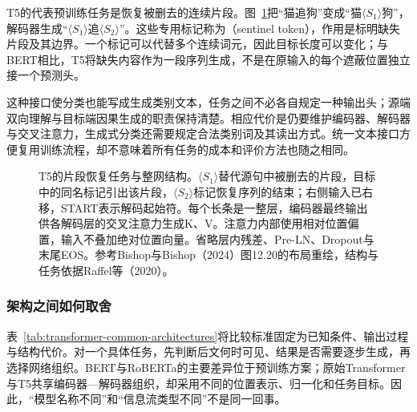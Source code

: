 T5的代表预训练任务是恢复被删去的连续片段。图~\ref{fig:transformer-architecture-t5}把“猫追狗”变成“猫$\langle S_1\rangle$狗”，解码器生成“$\langle S_1\rangle$追$\langle S_2\rangle$”。这些专用标记称为（sentinel token），作用是标明缺失片段及其边界。一个标记可以代替多个连续词元，因此目标长度可以变化；与BERT相比，T5将缺失内容作为一段序列生成，不是在原输入的每个遮蔽位置独立接一个预测头。

这种接口使分类也能写成生成类别文本，任务之间不必各自规定一种输出头；源端双向理解与目标端因果生成的职责保持清楚。相应代价是仍要维护编码器、解码器与交叉注意力，生成式分类还需要规定合法类别词及其读出方式。统一文本接口方便复用训练流程，却不意味着所有任务的成本和评价方法也随之相同。

\begin{figure}[p]
  \centering
  
  \caption{T5的片段恢复任务与整网结构。$\langle S_1\rangle$替代源句中被删去的片段，目标中的同名标记引出该片段，$\langle S_2\rangle$标记恢复序列的结束；右侧输入已右移，START表示解码起始符。每个长条是一整层，编码器最终输出供各解码层的交叉注意力生成K、V。注意力内部使用相对位置偏置，输入不叠加绝对位置向量。省略层内残差、Pre-LN、Dropout与末尾EOS。参考Bishop与Bishop（2024）图12.20的布局重绘，结构与任务依据Raffel等（2020）。}
  \label{fig:transformer-architecture-t5}
\end{figure}
\FloatBarrier

\subsubsection{架构之间如何取舍}

表~\ref{tab:transformer-common-architectures}将比较标准固定为已知条件、输出过程与结构代价。对一个具体任务，先判断后文何时可见、结果是否需要逐步生成，再选择网络组织。BERT与RoBERTa的主要差异位于预训练方案；原始Transformer与T5共享编码器—解码器组织，却采用不同的位置表示、归一化和任务目标。因此，“模型名称不同”和“信息流类型不同”不是同一回事。

